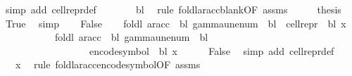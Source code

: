 \begin{isabellebody}
\ {\isacharparenleft}{\kern0pt}simp\ add{\isacharcolon}{\kern0pt}\ cell{\isacharunderscore}{\kern0pt}repr{\isacharunderscore}{\kern0pt}def{\isacharparenright}{\kern0pt}\isanewline
\ \ \isamarkupfalse%
\ \isamarkupfalse%
\ {\isachardoublequoteopen}{\isasymdots}\ {\isacharequal}{\kern0pt}\ bl{\isachardoublequoteclose}\ \isamarkupfalse%
\ {\isacharparenleft}{\kern0pt}rule\ foldl{\isacharunderscore}{\kern0pt}ar{\isacharunderscore}{\kern0pt}acc{\isacharunderscore}{\kern0pt}blank{\isacharbrackleft}{\kern0pt}OF\ assms{\isacharparenleft}{\kern0pt}{}{\isacharcomma}{\kern0pt}{}{\isacharparenright}{\kern0pt}{\isacharbrackright}{\kern0pt}{\isacharparenright}{\kern0pt}\isanewline
\ \ \isamarkupfalse%
\ \isamarkupfalse%
\ {\isacharquery}{\kern0pt}thesis\ \isamarkupfalse%
\ True\ \isamarkupfalse%
\ simp\isanewline
{}\isamarkupfalse%
\isanewline
\ \ \isamarkupfalse%
\ False\isanewline
\ \ \isamarkupfalse%
\ {\isachardoublequoteopen}foldl\ {\isacharparenleft}{\kern0pt}ar{\isacharunderscore}{\kern0pt}acc\ {\isasymGamma}\ bl{\isacharparenright}{\kern0pt}\ {\isacharparenleft}{\kern0pt}gamma{\isacharunderscore}{\kern0pt}unenum\ {\isasymGamma}\ bl\ {}{\isacharparenright}{\kern0pt}\ {\isacharparenleft}{\kern0pt}cell{\isacharunderscore}{\kern0pt}repr\ {\isasymGamma}\ bl\ x{\isacharparenright}{\kern0pt}\isanewline
\ \ \ \ \ \ \ \ \ \ {\isacharequal}{\kern0pt}\ foldl\ {\isacharparenleft}{\kern0pt}ar{\isacharunderscore}{\kern0pt}acc\ {\isasymGamma}\ bl{\isacharparenright}{\kern0pt}\ {\isacharparenleft}{\kern0pt}gamma{\isacharunderscore}{\kern0pt}unenum\ {\isasymGamma}\ bl\ {}{\isacharparenright}{\kern0pt}\isanewline
\ \ \ \ \ \ \ \ \ \ \ \ \ \ \ \ \ \ {\isacharparenleft}{\kern0pt}encode{\isacharunderscore}{\kern0pt}symbol\ {\isasymGamma}\ bl\ x{\isacharparenright}{\kern0pt}{\isachardoublequoteclose}\isanewline
\ \ \ \ \isamarkupfalse%
\ False\ \isamarkupfalse%
\ {\isacharparenleft}{\kern0pt}simp\ add{\isacharcolon}{\kern0pt}\ cell{\isacharunderscore}{\kern0pt}repr{\isacharunderscore}{\kern0pt}def{\isacharparenright}{\kern0pt}\isanewline
\ \ \isamarkupfalse%
\ \isamarkupfalse%
\ {\isachardoublequoteopen}{\isasymdots}\ {\isacharequal}{\kern0pt}\ x{\isachardoublequoteclose}\ \isamarkupfalse%
\ {\isacharparenleft}{\kern0pt}rule\ foldl{\isacharunderscore}{\kern0pt}ar{\isacharunderscore}{\kern0pt}acc{\isacharunderscore}{\kern0pt}encode{\isacharunderscore}{\kern0pt}symbol{\isacharbrackleft}{\kern0pt}OF\ assms{\isacharparenleft}{\kern0pt}{}{\isacharcomma}{\kern0pt}{}{\isacharparenright}{\kern0pt}{\isacharbrackright}{\kern0pt}{\isacharparenright}{\kern0pt}\isanewline

\end{isabellebody}
